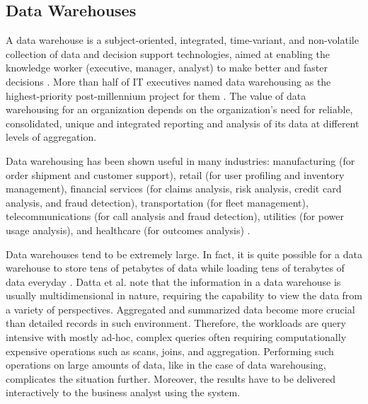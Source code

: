 \documentclass[12pt,a4paper]{article}
\begin{document}
\subsection{Data Warehouses}
\label{SEC-WAREHOUSES}
A data warehouse is a subject-oriented, integrated, time-variant, and non-volatile collection of data and decision support technologies, aimed at enabling the
knowledge worker (executive, manager, analyst) to make better and faster decisions \cite{inmon2002building, chaudhuri1997overview}. More than half of IT
executives named data warehousing as the highest-priority post-millennium project for them \cite{sen2005comparison}. The value of data warehousing for an
organization depends on the organization's need for reliable, consolidated, unique and integrated reporting and analysis of its data at different levels of
aggregation.

Data warehousing has been shown useful in many industries: manufacturing (for order shipment and customer support), retail (for user profiling and inventory
management), financial services (for claims analysis, risk analysis, credit card analysis, and fraud detection), transportation (for fleet management),
telecommunications (for call analysis and fraud detection), utilities (for power usage analysis), and healthcare (for outcomes analysis)
\cite{chaudhuri1997overview}.

Data warehouses tend to be extremely large. In fact, it is quite possible for a data warehouse to store tens of petabytes of data while loading tens of
terabytes
of data everyday \cite{thusoo2010data}. Datta et al. \cite {datta2002parallel} note that the information in a data warehouse is usually multidimensional in
nature, requiring the capability to view the data from a variety of perspectives. Aggregated and summarized data become more crucial than detailed records in
such environment. Therefore, the workloads are query intensive with mostly ad-hoc, complex queries often requiring computationally expensive operations such as
scans, joins, and aggregation. Performing such operations on large amounts of data, like in the case of data warehousing, complicates the situation further.
Moreover, the results have to be delivered interactively to the business analyst using the system.
\end{document}
